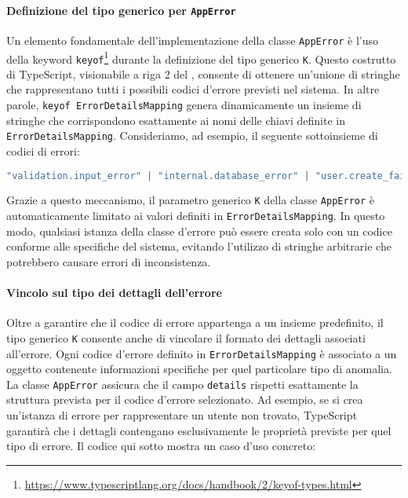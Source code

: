 

\paragraph{Definizione del tipo generico per \texttt{AppError}}
Un elemento fondamentale dell'implementazione della classe \texttt{AppError} è l'uso della keyword \texttt{keyof}\footnote{\url{https://www.typescriptlang.org/docs/handbook/2/keyof-types.html}} durante la definizione del tipo generico \texttt{K}. Questo costrutto di TypeScript, visionabile a riga 2 del , consente di ottenere un'unione di stringhe che rappresentano tutti i possibili codici d'errore previsti nel sistema. In altre parole, \texttt{keyof ErrorDetailsMapping} genera dinamicamente un insieme di stringhe che corrispondono esattamente ai nomi delle chiavi definite in \texttt{ErrorDetailsMapping}.
%
Consideriamo, ad esempio, il seguente sottoinsieme di codici di errori:
\begin{lstlisting}[language=typescript, caption={Esempio di unione di stringhe generate da \texttt{keyof}}]
  "validation.input_error" | "internal.database_error" | "user.create_failed"
\end{lstlisting}
%
Grazie a questo meccanismo, il parametro generico \texttt{K} della classe \texttt{AppError} è automaticamente limitato ai valori definiti in \texttt{ErrorDetailsMapping}. In questo modo, qualsiasi istanza della classe d'errore può essere creata solo con un codice conforme alle specifiche del sistema, evitando l'utilizzo di stringhe arbitrarie che potrebbero causare errori di inconsistenza.

\paragraph{Vincolo sul tipo dei dettagli dell’errore}
Oltre a garantire che il codice di errore appartenga a un insieme predefinito, il tipo generico \texttt{K} consente anche di vincolare il formato dei dettagli associati all’errore. Ogni codice d’errore definito in \texttt{ErrorDetailsMapping} è associato a un oggetto contenente informazioni specifiche per quel particolare tipo di anomalia. La classe \texttt{AppError} assicura che il campo \texttt{details} rispetti esattamente la struttura prevista per il codice d’errore selezionato.
%
Ad esempio, se si crea un'istanza di errore per rappresentare un utente non trovato, TypeScript garantirà che i dettagli contengano esclusivamente le proprietà previste per quel tipo di errore. Il codice qui sotto mostra un caso d’uso concreto:

